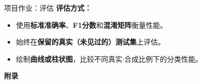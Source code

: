   \begin{refsection}
  \begin{frame}{项目作业：评估}
    \textbf{评估方式：}
    \begin{itemize}
      \item 使用\textbf{标准准确率}、\textbf{F1分数}和\textbf{混淆矩阵}衡量性能。
      \item 始终在\textbf{保留的真实（未见过的）测试集}上评估。
      \item 绘制\textbf{曲线或柱状图}，比较不同真实:合成比例下的分类性能。
    \end{itemize}
    \bottomleftrefs
  \end{frame}
  \end{refsection}
  




\begin{refsection}
  \begin{frame}[plain]
    \vfill
    \centering
    {\Huge \textbf{附录}}
    \vfill
  \end{frame}
\end{refsection}

